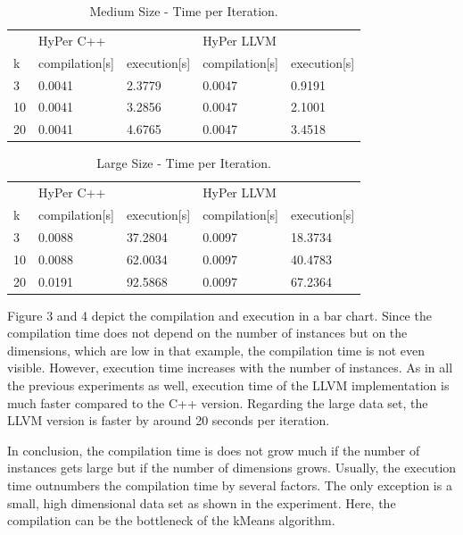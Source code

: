 \begin{table}[htsb]
  \caption[Medium Size - Time per Iteration]{Medium Size - Time per Iteration.}
  \label{tab:med_serial}
  \centering
  \begin{tabular}{l l l l l}
    \toprule
      & HyPer C++ & & HyPer LLVM & \\
      k & compilation[s] & execution[s] & compilation[s] & execution[s] \\
    \midrule
      3  & 0.0041 & 2.3779 & 0.0047 & 0.9191 \\
      10 & 0.0041 & 3.2856 & 0.0047 & 2.1001 \\
      20 & 0.0041 & 4.6765 & 0.0047 & 3.4518 \\
    \bottomrule
  \end{tabular}
\end{table}



\begin{table}[htsb]
  \caption[Large Size - Time per Iteration]{Large Size - Time per Iteration.}
  \label{tab:large_serial}
  \centering
  \begin{tabular}{l l l l l}
    \toprule
      & HyPer C++ & & HyPer LLVM & \\
      k & compilation[s] & execution[s] & compilation[s] & execution[s] \\
    \midrule
      3  & 0.0088 & 37.2804 & 0.0097 & 18.3734 \\
      10 & 0.0088 & 62.0034 & 0.0097 & 40.4783 \\
      20 & 0.0191 & 92.5868 & 0.0097 & 67.2364 \\
    \bottomrule
  \end{tabular}
\end{table}


Figure 3 and 4 depict the compilation and execution in a bar chart. Since the compilation time does not depend on the number of instances but on the dimensions, which are low in that example, the compilation time is not even visible. However, execution time increases with the number of instances. As in all the previous experiments as well, execution time of the LLVM implementation is much faster compared to the C++ version. Regarding the large data set, the LLVM version is faster by around 20 seconds per iteration. 

In conclusion, the compilation time is does not grow much if the number of instances gets large but if the number of dimensions grows. Usually, the execution time outnumbers the compilation time by several factors. The only exception is a small, high dimensional data set as shown in the experiment. Here, the compilation can be the bottleneck of the kMeans algorithm.


